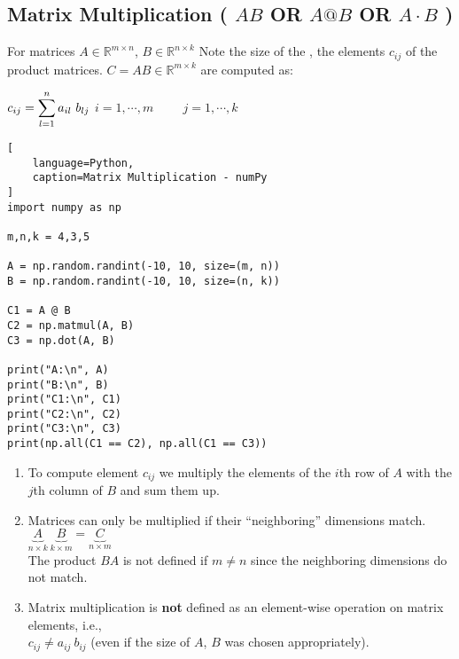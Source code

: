 \subsection{Matrix Multiplication ( $AB$ OR $A @ B$ OR $A\cdot B$ ) \cite{mfml/book/mml/Deisenroth-Faisal-Ong}}

For matrices $A \in \mathbb{R}^{m\times n}$, $B \in \mathbb{R}^{n\times k}$ Note the size of the , the elements $c_{ij}$ of the product matrices. $C = AB \in \mathbb{R}^{m\times k}$ are computed as:

\vspace{0.5cm}
\hfill
$
    c_{ij} = \dsum_{l=1}^n a_{il}\ b_{lj}
$
\hfill
$
    i = 1,\cdots,m
    \hspace{1cm}
    j = 1,\cdots,k
$
\hfill \cite{mfml/book/mml/Deisenroth-Faisal-Ong}





\begin{lstlisting}[
    language=Python,
    caption=Matrix Multiplication - numPy
]
import numpy as np

m,n,k = 4,3,5

A = np.random.randint(-10, 10, size=(m, n))
B = np.random.randint(-10, 10, size=(n, k))

C1 = A @ B
C2 = np.matmul(A, B)
C3 = np.dot(A, B)

print("A:\n", A)
print("B:\n", B)
print("C1:\n", C1)
print("C2:\n", C2)
print("C3:\n", C3)
print(np.all(C1 == C2), np.all(C1 == C3))
\end{lstlisting}




\vspace{0.5cm}

\begin{enumerate}[itemsep=0.2cm]
    \item To compute element $c_{ij}$ we multiply the elements of the $i$th row of $A$ with the $j$th column of $B$ and sum them up.
    \hfill \cite{mfml/book/mml/Deisenroth-Faisal-Ong}

    \item Matrices can only be multiplied if their “neighboring” dimensions match.
    \hfill \cite{mfml/book/mml/Deisenroth-Faisal-Ong}
    \\
    \hfill
    $
        \underset{n\times k}{\underbrace{A}}\
        \underset{k\times m}{\underbrace{B}}
        =
        \underset{n\times m}{\underbrace{C}}
    $
    \hfill \cite{mfml/book/mml/Deisenroth-Faisal-Ong}
    \\
    The product $BA$ is not defined if $m \neq n$ since the neighboring dimensions do not match.

    \item Matrix multiplication is \textbf{not} defined as an element-wise operation on matrix elements, i.e., 
    \\
    $c_{ij} \neq a_{ij}\ b_{ij}$ (even if the size of $A$, $B$ was chosen appropriately).
    \hfill \cite{mfml/book/mml/Deisenroth-Faisal-Ong}
\end{enumerate}


